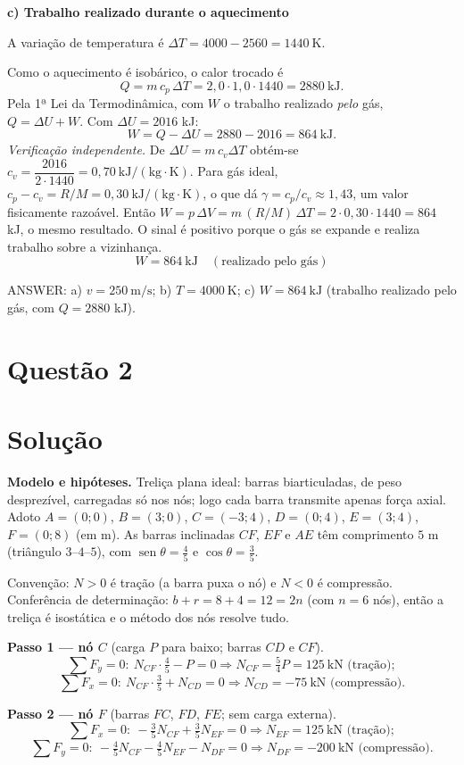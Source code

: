 \documentclass{article}%
\begin{document}
\textbf{c) Trabalho realizado durante o aquecimento}

A variação de temperatura é $\Delta T=4000-2560=1440\ \mathrm{K}$.

Como o aquecimento é isobárico, o calor trocado é
\[
Q=m\,c_p\,\Delta T=2{,}0\cdot1{,}0\cdot1440=2880\ \mathrm{kJ}.
\]
Pela 1ª Lei da Termodinâmica, com $W$ o trabalho realizado \emph{pelo} gás, $Q=\Delta U+W$. Com $\Delta U=2016$ kJ:
\[
W=Q-\Delta U=2880-2016=864\ \mathrm{kJ}.
\]
\emph{Verificação independente.} De $\Delta U=m\,c_v\Delta T$ obtém-se $c_v=\dfrac{2016}{2\cdot1440}=0{,}70\ \mathrm{kJ/(kg\cdot K)}$. Para gás ideal, $c_p-c_v=R/M=0{,}30\ \mathrm{kJ/(kg\cdot K)}$, o que dá $\gamma=c_p/c_v\approx1{,}43$, um valor fisicamente razoável. Então $W=p\,\Delta V=m\,(R/M)\,\Delta T=2\cdot0{,}30\cdot1440=864$ kJ, o mesmo resultado. O sinal é positivo porque o gás se expande e realiza trabalho sobre a vizinhança.
\[
\boxed{W=864\ \mathrm{kJ}}\quad(\text{realizado pelo gás})
\]

ANSWER: a) $v=250\ \mathrm{m/s}$; b) $T=4000\ \mathrm{K}$; c) $W=864\ \mathrm{kJ}$ (trabalho realizado pelo gás, com $Q=2880$ kJ).%
\newpage%
\section*{Questão 2}

\section*{Solução}

\textbf{Modelo e hipóteses.} Treliça plana ideal: barras biarticuladas, de peso desprezível, carregadas só nos nós; logo cada barra transmite apenas força axial. Adoto $A=(0;0)$, $B=(3;0)$, $C=(-3;4)$, $D=(0;4)$, $E=(3;4)$, $F=(0;8)$ (em m). As barras inclinadas $CF$, $EF$ e $AE$ têm comprimento $5$ m (triângulo $3$--$4$--$5$), com $\operatorname{sen}\theta=\tfrac45$ e $\cos\theta=\tfrac35$.

Convenção: $N>0$ é tração (a barra puxa o nó) e $N<0$ é compressão. Conferência de determinação: $b+r=8+4=12=2n$ (com $n=6$ nós), então a treliça é isostática e o método dos nós resolve tudo.

\textbf{Passo 1 --- nó $C$} (carga $P$ para baixo; barras $CD$ e $CF$).
\[
\sum F_y=0:\ N_{CF}\cdot\tfrac45-P=0\Rightarrow N_{CF}=\tfrac54P=125\ \text{kN (tração)};
\]
\[
\sum F_x=0:\ N_{CF}\cdot\tfrac35+N_{CD}=0\Rightarrow N_{CD}=-75\ \text{kN (compressão)}.
\]

\textbf{Passo 2 --- nó $F$} (barras $FC$, $FD$, $FE$; sem carga externa).
\[
\sum F_x=0:\ -\tfrac35N_{CF}+\tfrac35N_{EF}=0\Rightarrow N_{EF}=125\ \text{kN (tração)};
\]
\[
\sum F_y=0:\ -\tfrac45N_{CF}-\tfrac45N_{EF}-N_{DF}=0\Rightarrow N_{DF}=-200\ \text{kN (compressão)}.
\]
\end{document}
